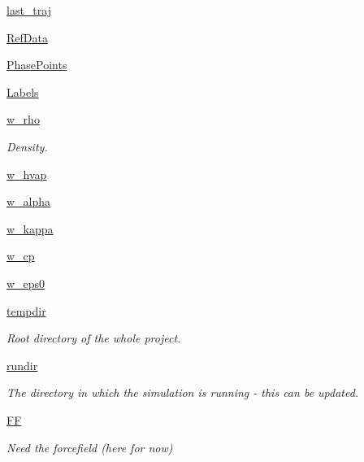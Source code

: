 \begin{DoxyCompactItemize}
\item 
\hyperlink{classforcebalance_1_1liquid_1_1Liquid_acf4158ed2337a04bdee3ee3f2f16283c}{last\-\_\-traj}
\item 
\hyperlink{classforcebalance_1_1liquid_1_1Liquid_a2567b4431d446cbe76e491c00ac9b6c1}{\-Ref\-Data}
\item 
\hyperlink{classforcebalance_1_1liquid_1_1Liquid_a2333919b4fc49482ed23b5e66eaa0ea8}{\-Phase\-Points}
\item 
\hyperlink{classforcebalance_1_1liquid_1_1Liquid_a16afa7eeca3234f74f60ac085dd8eb5b}{\-Labels}
\item 
\hyperlink{classforcebalance_1_1liquid_1_1Liquid_a677f8c01349a91716e10353633a4c5c1}{w\-\_\-rho}
\begin{DoxyCompactList}\small\item\em \-Density. \end{DoxyCompactList}\item 
\hyperlink{classforcebalance_1_1liquid_1_1Liquid_a7f43411fa6a9c39b63f1e82fe78ea597}{w\-\_\-hvap}
\item 
\hyperlink{classforcebalance_1_1liquid_1_1Liquid_a6ada133a0ceeb17e032f1337242afcf0}{w\-\_\-alpha}
\item 
\hyperlink{classforcebalance_1_1liquid_1_1Liquid_a19f8897aad045e3bf51eedba4606ac87}{w\-\_\-kappa}
\item 
\hyperlink{classforcebalance_1_1liquid_1_1Liquid_a614365b5ac24f312c564e4f8d2b7b4cf}{w\-\_\-cp}
\item 
\hyperlink{classforcebalance_1_1liquid_1_1Liquid_af99c11c0ba5bbfcbc53bc8d7d6125465}{w\-\_\-eps0}
\item 
\hyperlink{classforcebalance_1_1target_1_1Target_aede2856573b890cd47054ad36937d6f6}{tempdir}
\begin{DoxyCompactList}\small\item\em \-Root directory of the whole project. \end{DoxyCompactList}\item 
\hyperlink{classforcebalance_1_1target_1_1Target_a1da470037ef61c22dc44beb85cfa01a9}{rundir}
\begin{DoxyCompactList}\small\item\em \-The directory in which the simulation is running -\/ this can be updated. \end{DoxyCompactList}\item 
\hyperlink{classforcebalance_1_1target_1_1Target_a796dc30a19a60c63fb43b088d40a963f}{\-F\-F}
\begin{DoxyCompactList}\small\item\em \-Need the forcefield (here for now) \end{DoxyCompactList}\item 

\end{DoxyCompactItemize}
